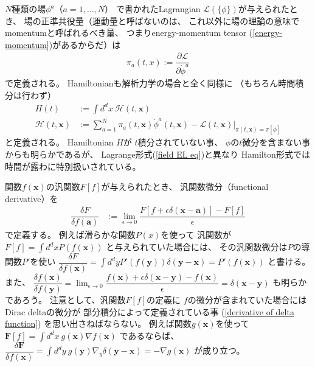 $N$種類の場$\phi^a$（$a = 1, \dots, N$）
で書かれたLagrangian
$\mathcal{L}(\{ \phi \})$が与えられたとき、
場の正準共役量（運動量と呼ばないのは、
これ以外に場の理論の意味でmomentumと呼ばれるべき量、
つまりenergy-momentum tensor (\ref{energy-momentum})があるからだ）は
\begin{align}
    \pi_a (t, x)
    := \dfrac{\partial \mathcal{L}}
        {\partial \dot{\phi}^a}
\end{align}
で定義される。
Hamiltonianも解析力学の場合と全く同様に
（もちろん時間積分は行わず）
\begin{subequations}
\begin{align}
    H (t)
    &:=
    \int d^d x\ 
        \mathcal{H} (t, \bm{x})
\\
    \mathcal{H} (t, \bm{x})
    &:=
    \sum_{a = 1}^N
        \pi_a (t, \bm{x})
        \dot{\phi}^a (t, \bm{x})
    -
    \mathcal{L}(t, \bm{x})
    \bigg|_{
        \pi(t, \bm{x})
        = \pi[\dot{\phi}]
    }
\end{align}
\end{subequations}
と定義される。
Hamiltonian $H$が
$t$積分されていない事、
$\phi$の$t$微分を含まない事からも明らかであるが、
Lagrange形式(\ref{field EL eq})と異なり
Hamilton形式では時間が露わに特別扱いされている。

関数$f(\bm{x})$の汎関数$F[f]$が与えられたとき、
汎関数微分（functional derivative）を
\begin{align}
    \dfrac{ \delta F }
        {\delta f(\bm{a})}
&:=
    \lim_{ \epsilon \to 0 }
    \dfrac{
        F[ f + \epsilon
            \delta(\bm{x} - \bm{a}) ]
    -
        F[ f ]
    }
        {\epsilon}
\end{align}
で定義する。
例えば滑らかな関数$P(x)$を使って
汎関数が
$\displaystyle
F[f] = \int d^d x P(f(\bm{x}))$
と与えられていた場合には、
その汎関数微分は$P$の導関数$P'$を使い
$\displaystyle
    \dfrac{\delta F}{\delta f(\bm{x})}
=
    \int d^d y
    P'( f(\bm{y}) )
    \delta(\bm{y} - \bm{x})
=
    P'( f(\bm{x}) )$
と書ける。
また、
$\displaystyle
\dfrac{\delta f(\bm{x})}
    {\delta f(\bm{y})}
= \lim_{\epsilon \to 0}
\dfrac{
    f(\bm{x})
    + \epsilon \delta(\bm{x} - \bm{y})
    - f(\bm{x})
}{\epsilon}
= \delta(\bm{x} - \bm{y})$
も明らかであろう。
注意として、汎関数$F[f]$の定義に
$f$の微分が含まれていた場合には
Dirac deltaの微分が
部分積分によって定義されている事
(\ref{derivative of delta function})
を思い出さねばならない。
例えば関数$g(\bm{x})$を使って
$\displaystyle
\bm{F}[f] = \int d^d x\ 
    g(\bm{x}) \nabla f(\bm{x})$
であるならば、
$\displaystyle
\dfrac{ \delta \bm{F} }
    {\delta f(\bm{x})}
= \int d^d y\ 
g(\bm{y}) \nabla_y
    \delta(\bm{y} - \bm{x})
= - \nabla g(\bm{x})$
が成り立つ。

